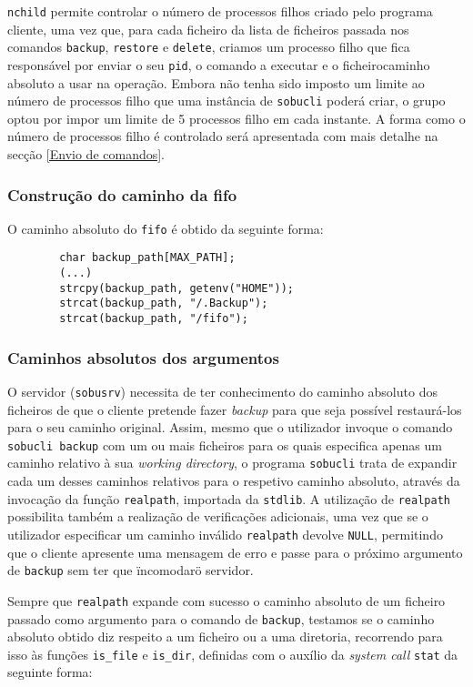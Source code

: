 \documentclass[a4paper,12pt,titlepage,portuguese]{article}
\begin{document}
\texttt{nchild} permite controlar o número de processos filhos criado pelo programa cliente, uma vez que, para cada ficheiro da lista de ficheiros passada nos comandos \texttt{backup}, \texttt{restore} e \texttt{delete}, criamos um processo filho que fica responsável por enviar o seu \texttt{pid}, o comando a executar e o ficheiro\/caminho absoluto a usar na operação. Embora não tenha sido imposto um limite ao número de processos filho que uma instância de \texttt{sobucli} poderá criar, o grupo optou por impor um limite de 5 processos filho em cada instante. A forma como o número de processos filho é controlado será apresentada com mais detalhe na secção \ref{Envio de comandos}.

\subsubsection{Construção do caminho da fifo}

O caminho absoluto do \texttt{fifo} é obtido da seguinte forma:
	\begin{verbatim}
		char backup_path[MAX_PATH];
		(...)
		strcpy(backup_path, getenv("HOME"));
		strcat(backup_path, "/.Backup");
		strcat(backup_path, "/fifo");
	\end{verbatim}

\subsubsection{Caminhos absolutos dos argumentos}

O servidor (\texttt{sobusrv}) necessita de ter conhecimento do caminho absoluto dos ficheiros de que o cliente pretende fazer \emph{backup} para que seja possível restaurá-los para o seu caminho original. Assim, mesmo que o utilizador invoque o comando \texttt{sobucli backup} com um ou mais ficheiros para os quais especifica apenas um caminho relativo à sua \emph{working directory}, o programa \texttt{sobucli} trata de expandir cada um desses caminhos relativos para o respetivo caminho absoluto, através da invocação da função \texttt{realpath}, importada da \texttt{stdlib}. A utilização de \texttt{realpath} possibilita também a realização de verificações adicionais, uma vez que se o utilizador especificar um caminho inválido \texttt{realpath} devolve \texttt{NULL}, permitindo que o cliente apresente uma mensagem de erro e passe para o próximo argumento de \texttt{backup} sem ter que \"incomodar\" o servidor.

Sempre que \texttt{realpath} expande com sucesso o caminho absoluto de um ficheiro passado como argumento para o comando de \texttt{backup}, testamos se o caminho absoluto obtido diz respeito a um ficheiro ou a uma diretoria, recorrendo para isso às funções \texttt{is\_file} e \texttt{is\_dir}, definidas com o auxílio da \emph{system call} \texttt{stat} da seguinte forma:
\end{document}
